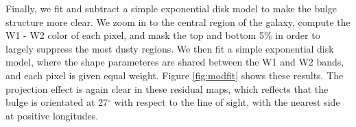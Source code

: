 \documentclass[12pt, preprint]{aastex}
\begin{document}
Finally, we fit and subtract a simple exponential disk model to make the bulge structure more clear.  We zoom in to the central region of the galaxy, compute the W1 - W2 color of each pixel, and mask the top and bottom 5\% in order to largely suppress the most dusty regions.  We then fit a simple exponential disk model, where the shape parameteres are shared between the W1 and W2 bands, and each pixel is given equal weight.
Figure \ref{fig:modfit} shows these results.
The projection effect is again clear in these residual maps, which reflects that the bulge is orientated at 27$^\circ$ with respect to the line of sight, with the nearest side at  positive longitudes. %
\end{document}
